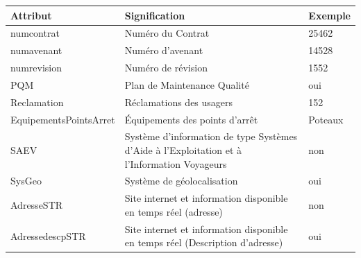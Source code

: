 \documentclass[a4paper]{report}
\begin{document}
\begin{doublespace}
	\begin{table}[H]
		\begin{center}
			\begin{tabularx}{17.5cm}{|p{4cm}|X|p{2.5cm}|}
				\hline
				\textbf{Attribut}         & \textbf{Signification}                                                                                        & \textbf{Exemple} \\
				\hline
				numcontrat                & Numéro du Contrat                                                                                             & 25462            \\
				\hline
				numavenant                & Numéro d'avenant                                                                                              & 14528            \\
				\hline
				numrevision               & Numéro de révision                                                                                            & 1552             \\
				\hline
				PQM                       & Plan de Maintenance Qualité                                                                                   & oui              \\
				\hline
				Reclamation               & Réclamations des usagers                                                                                      & 152              \\
				\hline
				EquipementsPointsArret    & Équipements des points d'arrêt                                                                                & Poteaux          \\
				\hline
				SAEV                      & Système d'information de type Systèmes d'Aide à l'Exploitation et
				à l'Information Voyageurs & non                                                                                                                              \\
				\hline
				SysGeo                    & Système de géolocalisation                                                                                    & oui              \\
				\hline
				AdresseSTR                & Site internet et information disponible en temps réel (adresse)                                               & non              \\
				\hline
				AdressedescpSTR           & Site internet et information disponible  en temps réel (Description d'adresse)                                & oui              \\

\end{tabularx}
\end{center}
\end{table}
\end{doublespace}
\end{document}
